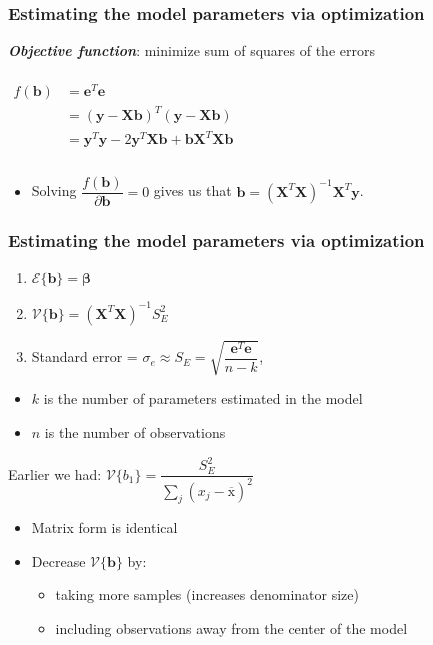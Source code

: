 \begin{frame}\frametitle{Estimating the model parameters via optimization}
	
	\textbf{\emph{Objective function}}: minimize sum of squares of the errors
	
	$ 
	\begin{array}{rl}
		& \\
		f(\mathbf{b}) &= \mathbf{e}^T\mathbf{e} \\
		&= \left(\mathbf{y} - \mathbf{X} \mathbf{b} \right)^T \left( \mathbf{y} - \mathbf{X} \mathbf{b} \right) \\
		&= \mathbf{y}^T\mathbf{y} - 2 \mathbf{y}^T\mathbf{X}\mathbf{b} + \mathbf{b}\mathbf{X}^T\mathbf{X}\mathbf{b} \\
		\\
	\end{array}
	$ 
	\begin{itemize}
		\item	Solving $\dfrac{f(\mathbf{b})}{
		\partial{\mathbf{b}}} = 0 $ gives us that $\mathbf{b} = \left( \mathbf{X}^T\mathbf{X} \right)^{-1}\mathbf{X}^T\mathbf{y}$. 
	\end{itemize}
\end{frame}

\begin{frame}\frametitle{Estimating the model parameters via optimization}
	\begin{enumerate}
		\item	$\mathcal{E}\{\mathbf{b}\} = \mathbf{\beta}$ 
		\item	$\mathcal{V}\{\mathbf{b}\} = \left( \mathbf{X}^T\mathbf{X} \right)^{-1} S_E^2$ 
		\item	Standard error = $\sigma_e \approx S_E = \sqrt{\dfrac{\mathbf{e}^T\mathbf{e}}{n-k}}$, 
	\end{enumerate}
	\begin{itemize}
		\item	$k$ is the number of parameters estimated in the model 
		\item	$n$ is the number of observations 
	\end{itemize}
	
	Earlier we had: $\mathcal{V}\{b_1\} = \dfrac{S_E^2}{\sum_j{\left( x_j - \overline{\mathrm{x}} \right)^2}}$ 
	\begin{itemize}
		\item	Matrix form is identical 
		\item	Decrease $\mathcal{V}\{\mathbf{b}\}$ by: 
		\begin{itemize}
			\item	taking more samples (increases denominator size) 
			\item	including observations away from the center of the model 
		\end{itemize}
	\end{itemize}
\end{frame}

